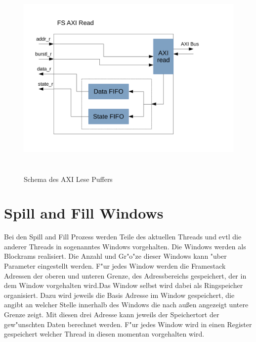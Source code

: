 \begin{figure}[H]
	\centering
	\includegraphics[height = 10cm]{PS_RS_graphics/AxiReadBuffer.pdf}
	\caption{Schema des AXI Lese Puffers}
\end{figure}

\section{Spill and Fill Windows}

Bei den Spill and Fill Prozess werden Teile des aktuellen Threads  und evtl die anderer Threads in sogenanntes Windows vorgehalten. Die Windows werden als Blockrams realisiert. 
Die Anzahl und Gr"o"ze dieser Windows kann "uber Parameter eingestellt werden. F"ur jedes Window werden die Framestack Adressen der oberen und unteren Grenze, des Adressbereichs gespeichert, der in dem Window vorgehalten wird.Das Window selbst wird dabei als Ringspeicher organisiert. Dazu wird jeweils die Basis Adresse im Window gespeichert, die angibt an welcher Stelle innerhalb des Windows die nach außen angezeigt untere Grenze zeigt. Mit diesen drei Adresse kann jeweils der Speichertort der gew"unschten Daten berechnet werden. 
F"ur jedes Window wird in einen Register gespeichert welcher Thread in diesen momentan vorgehalten wird. 

